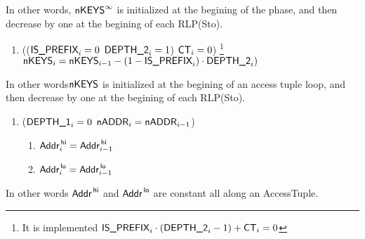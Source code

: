 In other words, $\textsf{nKEYS}^\infty$ is initialized at the begining of the phase, and then decrease by one at the begining of each RLP(Sto).
\begin{enumerate}[resume]
	\item \If (($\textsf{IS\_PREFIX}_{i}=0$ \Or $\textsf{DEPTH\_2}_{i}=1$) \et $\textsf{CT}_{i}=0$) \footnote{It is implemented \If $\textsf{IS\_PREFIX}_{i} \cdot (\textsf{DEPTH\_2}_{i}-1) +\textsf{CT}_{i} =0$ \Then} \Then $\textsf{nKEYS}_{i} = \textsf{nKEYS}_{i-1} - (1- \textsf{IS\_PREFIX}_{i}) \cdot \textsf{DEPTH\_2}_{i})$
\end{enumerate}
In other words$\textsf{nKEYS}$ is initialized at the begining of an access tuple loop, and then decrease by one at the begining of each RLP(Sto).
\begin{enumerate}[resume]
	\item \If ($\textsf{DEPTH\_1}_{i}=0$ \et $\textsf{nADDR}_{i}=\textsf{nADDR}_{i-1}$) \Then 
		\begin{enumerate}
			\item $\textsf{Addr}^{\mathsf{\,hi}}_{i} = \textsf{Addr}^{\mathsf{\,hi}}_{i-1}$
			\item $\textsf{Addr}^{\mathsf{\,lo}}_{i} = \textsf{Addr}^{\mathsf{\,lo}}_{i-1}$
		\end{enumerate}
\end{enumerate}
In other words $\textsf{Addr}^{\mathsf{\,hi}}$ and $\textsf{Addr}^{\mathsf{\,lo}}$ are constant all along an AccessTuple.

